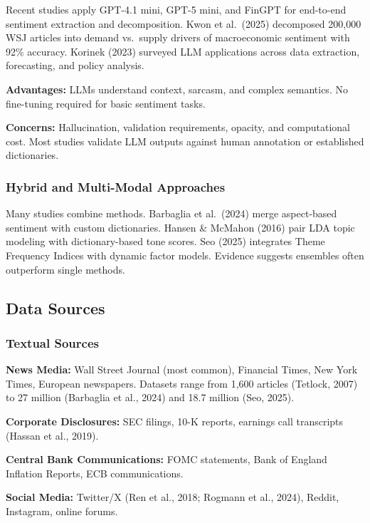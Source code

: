 \documentclass[12pt,a4paper]{article}
\begin{document}
Recent studies apply GPT-4.1 mini, GPT-5 mini, and FinGPT for end-to-end sentiment extraction and decomposition. Kwon et al.\ (2025) decomposed 200,000 WSJ articles into demand vs.\ supply drivers of macroeconomic sentiment with 92\% accuracy. Korinek (2023) surveyed LLM applications across data extraction, forecasting, and policy analysis.

\textbf{Advantages:} LLMs understand context, sarcasm, and complex semantics. No fine-tuning required for basic sentiment tasks.

\textbf{Concerns:} Hallucination, validation requirements, opacity, and computational cost. Most studies validate LLM outputs against human annotation or established dictionaries.

\subsubsection{Hybrid and Multi-Modal Approaches}

Many studies combine methods. Barbaglia et al.\ (2024) merge aspect-based sentiment with custom dictionaries. Hansen \& McMahon (2016) pair LDA topic modeling with dictionary-based tone scores. Seo (2025) integrates Theme Frequency Indices with dynamic factor models. Evidence suggests ensembles often outperform single methods.

\subsection{Data Sources}
\label{subsec:data_sources}

\subsubsection{Textual Sources}

\textbf{News Media:} Wall Street Journal (most common), Financial Times, New York Times, European newspapers. Datasets range from 1,600 articles (Tetlock, 2007) to 27 million (Barbaglia et al., 2024) and 18.7 million (Seo, 2025).

\textbf{Corporate Disclosures:} SEC filings, 10-K reports, earnings call transcripts (Hassan et al., 2019).

\textbf{Central Bank Communications:} FOMC statements, Bank of England Inflation Reports, ECB communications.

\textbf{Social Media:} Twitter/X (Ren et al., 2018; Rogmann et al., 2024), Reddit, Instagram, online forums.
\end{document}

